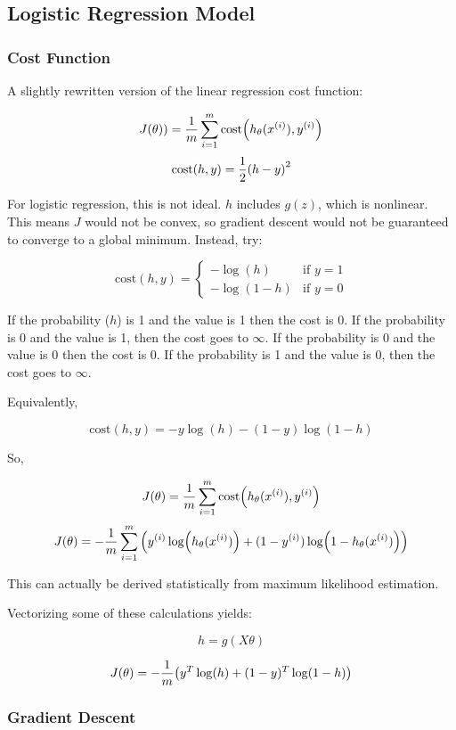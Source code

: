 \subsection{Logistic Regression Model}

\subsubsection{Cost Function}

A slightly rewritten version of the linear regression cost function:

\[ J(\theta)) = \frac{1}{m} \sum_{i=1}^m \mathrm{cost}\qty(h_\theta(x_{}^{(i)}), y_{}^{(i)}) \]
\[ \mathrm{cost}\qty(h, y) = \frac{1}{2} \qty(h - y)^2 \]

For logistic regression, this is not ideal.
$h$ includes $g(z)$, which is nonlinear.
This means $J$ would not be convex, so gradient descent would
not be guaranteed to converge to a global minimum.
Instead, try:

\[ 
  \mathrm{cost}(h, y) =
  \begin{cases}
  -\log(h)   & \mbox{if } y=1 \\
  -\log(1-h) & \mbox{if } y=0
  \end{cases}
\]

If the probability ($h$) is 1 and the value is 1 then the cost is 0.
If the probability is 0 and the value is 1, then the cost goes to $\infty$.
If the probability is 0 and the value is 0 then the cost is 0.
If the probability is 1 and the value is 0, then the cost goes to $\infty$.

Equivalently,

\[ \mathrm{cost}(h, y) = -y\log(h) - (1-y)\log(1-h) \]

So,

\[ J(\theta) = \frac{1}{m} \sum_{i=1}^m \mathrm{cost}\qty(h_\theta(x_{}^{(i)}), y_{}^{(i)}) \]
\[ J(\theta) = -\frac{1}{m} \sum_{i=1}^m \qty(  
    y_{}^{(i)} \log(h_\theta(x_{}^{(i)})) + (1-y_{}^{(i)})\log(1-h_\theta(x_{}^{(i)}))
   )
\]

This can actually be derived statistically from maximum likelihood estimation.

Vectorizing some of these calculations yields:

\[ h = g(X\theta) \]

\[ J(\theta) = -\frac{1}{m} \qty( y^T\log(h) + (1-y)^T\log(1-h)) \]

\subsubsection{Gradient Descent}

